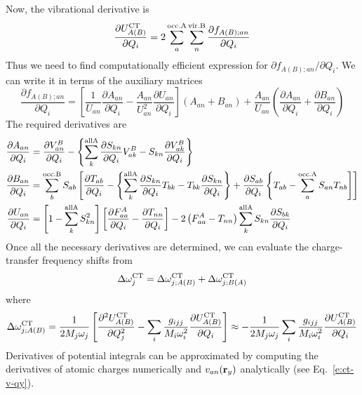 \documentclass[a4paper,titlepage,twoside,fleqn,12pt]{book}
\newcommand{\fderiv}[2]{\ensuremath{
    \frac{\partial #1}{\partial #2}}}
\newcommand{\sderiv}[2]{\ensuremath{
    \frac{\partial^2 #1}{\partial #2^2}
    }}
\newcommand{\fderivm}[2]{\ensuremath{
    {\partial #1}/{\partial #2}}}
\begin{document}
\begin{refsection}
Now, the vibrational derivative is
%
\begin{equation}   \label{e:force-ct-ab}
  \fderiv{U^{\rm CT}_{A(B)}}{Q_i} = 2\sum_a^{\rm occ. A} \sum_n^{\rm vir. B} \fderiv{f_{A(B);an}}{Q_i}
\end{equation}
%
Thus we need to find computationally efficient expression for $\fderivm{f_{A(B);an}}{Q_i}$.
We can write it in terms of the auxiliary matrices
%
\begin{equation}  
  \fderiv{f_{A(B);an}}{Q_i} = 
  \left[
 \frac{1}{U_{an}} \fderiv{A_{an}}{Q_i} - \frac{A_{an}}{U_{an}^2} \fderiv{U_{an}}{Q_i}
  \right] \left( A_{an} + B_{an} \right) 
   +
  \frac{A_{an}}{U_{an}} \left( \fderiv{A_{an}}{Q_i} + \fderiv{B_{an}}{Q_i} \right)
\end{equation}
%
The required derivatives are
%
\begin{subequations}  
\begin{align}
    \fderiv{A_{an}}{Q_i}  &= \fderiv{V^B_{an}}{Q_i} 
       - \left\{
          \sum_k^{\rm all A} \fderiv{S_{kn}}{Q_i}  V_{ak}^B - S_{kn} \fderiv{V_{ak}^B}{Q_i}
         \right\}  \\
    \fderiv{B_{an}}{Q_i}  &= \sum_b^{\rm occ. B} S_{ab} \left[ 
         \fderiv{T_{ab}}{Q_i} - \left\{
          \sum_k^{\rm all A} \fderiv{S_{kn}}{Q_i}  T_{bk} - T_{bk} \fderiv{S_{kn}}{Q_i}
         \right\} + \fderiv{S_{ab}}{Q_i}  \left\{ T_{ab} - \sum_a^{\rm occ. A} S_{an}T_{nb} \right]
       \right] \\
    \fderiv{U_{an}}{Q_i}  &= \left[ 1 - \sum_k^{\rm all A} S^2_{kn}\right]
                             \left[ \fderiv{F_{aa}^A}{Q_i} - \fderiv{T_{nn}}{Q_i}\right] 
                     -2  \left( F_{aa}^A - T_{nn} \right) \sum_k^{\rm all A} S_{kn} \fderiv{S_{bk}}{Q_i}
\end{align}
\end{subequations}
%
Once all the necessary derivatives are determined, 
we can evaluate the charge\hyp{}transfer frequency shifts
from
%
\begin{equation} \label{e:dw-ct}
\Delta \omega_j^{\rm CT} =
\Delta \omega_{j;A(B)}^{\rm CT} + \Delta \omega_{j;B(A)}^{\rm CT}
\end{equation}
%
where
%
\begin{equation} \label{e:dw-ct-ab}
\Delta \omega_{j;A(B)}^{\rm CT} =
\frac{1}{2M_j\omega_j} \left[ 
\sderiv{U^{\rm CT}_{A(B)}}{Q_j} -
\sum_i \frac{g_{ijj}}{M_i\omega_i^2}\fderiv{U^{\rm CT}_{A(B)}}{Q_i}
\right]
\approx 
-\frac{1}{2M_j\omega_j}\sum_i \frac{g_{ijj}}{M_i\omega_i^2}\fderiv{U^{\rm CT}_{A(B)}}{Q_i}
\end{equation}
%
Derivatives of potential integrals can be approximated by
computing the derivatives of atomic charges numerically
and $v_{an}({\bf r}_y)$ analytically (see Eq.~\eqref{e:ct-v-qy}).


\end{refsection}
\end{document}
